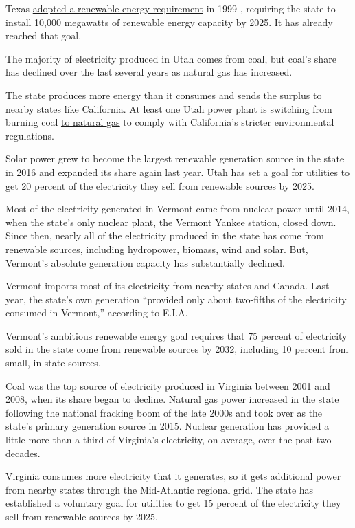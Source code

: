 Texas
\href{http://programs.dsireusa.org/system/program/detail/182}{adopted a
renewable energy requirement} in 1999 , requiring the state to install
10,000 megawatts of renewable energy capacity by 2025. It has already
reached that goal.

The majority of electricity produced in Utah comes from coal, but coal's
share has declined over the last several years as natural gas has
increased.

The state produces more energy than it consumes and sends the surplus to
nearby states like California. At least one Utah power plant is
switching from burning coal
\href{http://articles.latimes.com/2013/apr/23/local/la-me-ln-council-coal-energy-20130423}{to
natural gas} to comply with California's stricter environmental
regulations.

Solar power grew to become the largest renewable generation source in
the state in 2016 and expanded its share again last year. Utah has set a
goal for utilities to get 20 percent of the electricity they sell from
renewable sources by 2025.

Most of the electricity generated in Vermont came from nuclear power
until 2014, when the state's only nuclear plant, the Vermont Yankee
station, closed down. Since then, nearly all of the electricity produced
in the state has come from renewable sources, including hydropower,
biomass, wind and solar. But, Vermont's absolute generation capacity has
substantially declined.

Vermont imports most of its electricity from nearby states and Canada.
Last year, the state's own generation ``provided only about two-fifths
of the electricity consumed in Vermont,'' according to E.I.A.

Vermont's ambitious renewable energy goal requires that 75 percent of
electricity sold in the state come from renewable sources by 2032,
including 10 percent from small, in-state sources.

Coal was the top source of electricity produced in Virginia between 2001
and 2008, when its share began to decline. Natural gas power increased
in the state following the national fracking boom of the late 2000s and
took over as the state's primary generation source in 2015. Nuclear
generation has provided a little more than a third of Virginia's
electricity, on average, over the past two decades.

Virginia consumes more electricity that it generates, so it gets
additional power from nearby states through the Mid-Atlantic regional
grid. The state has established a voluntary goal for utilities to get 15
percent of the electricity they sell from renewable sources by 2025.

